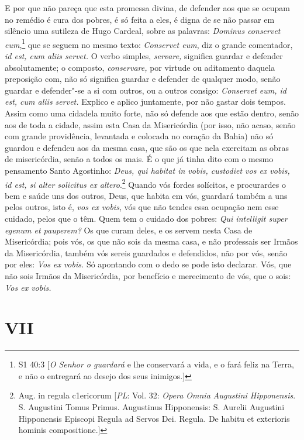 E por que não pareça que esta promessa divina, de defender aos que se
ocupam no remédio é cura dos pobres, é só feita a eles, é digna de se
não passar em silêncio uma sutileza de Hugo Cardeal, sobre as palavras:
\emph{Dominus conservet eum},\footnote{S1 40:3 [\textit{O Senhor o guardará} e lhe conservará a vida, e o fará feliz na Terra, e não o entregará ao desejo dos seus inimigos.]} que se seguem no mesmo texto:
\emph{Conservet eum}, diz o grande comentador, \emph{id est, cum aliis
servet.} O verbo simples, \emph{servare,} significa guardar e defender
absolutamente; o composto, \emph{conservare,} por virtude ou aditamento
daquela preposição com, não só significa guardar e defender de qualquer
modo, senão guardar e defender"-se a si com outros, ou a outros consigo:
\emph{Conservet eum, id est, cum aliis servet.} Explico e aplico
juntamente, por não gastar dois tempos. Assim como uma cidadela muito
forte, não só defende aos que estão dentro, senão aos de toda a cidade,
assim esta Casa da Misericórdia (por isso, não acaso, senão com grande
providência, levantada e colocada no coração da Bahia) não só guardou e
defendeu aos da mesma casa, que são os que nela exercitam as obras de
misericórdia, senão a todos os mais. É o que já tinha dito com o mesmo
pensamento Santo Agostinho: \emph{Deus, qui habitat in vobis, custodiet
vos ex vobis, id est, si alter solicitus ex altero}.\footnote{Aug. in regula c1ericorum [\textit{PL}: Vol. 32: \textit{Opera Omnia Augustini Hipponensis}. S. Augustini Tomus Primus. Augustinus Hipponensis: S. Aurelii Augustini Hipponensis Episcopi Regula ad Servos Dei. Regula. De habitu et exterioris hominis compositione.]} Quando vós
fordes solícitos, e procurardes o bem e saúde uns dos outros, Deus, que
habita em vós, guardará também a uns pelos outros, isto é, \emph{vos ex
vobis}, vós que não tendes essa ocupação nem esse cuidado, pelos que o
têm.
Quem tem o cuidado dos pobres: \emph{Qui intelligit super egenum et
pauperem?} Os que curam deles, e os servem nesta Casa de Misericórdia; pois vós, os
que não sois da mesma casa, e não professais ser Irmãos da Misericórdia,
também vós sereis guardados e defendidos, não por vós, senão por eles:
\emph{Vos ex vobis.} Só apontando com o dedo se pode isto declarar.
Vós, que não sois Irmãos da Misericórdia, por benefício e merecimento de
vós, que o sois: \emph{Vos ex vobis.}

\section*{VII}

